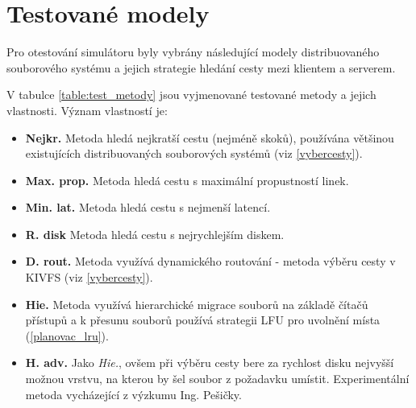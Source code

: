 \documentclass[czech,DP]{thesiskiv}
\begin{document}
\section{Testované modely}

Pro otestování simulátoru byly vybrány následující modely distribuovaného souborového systému a jejich strategie hledání cesty mezi klientem a serverem. 

V tabulce \ref{table:test_metody} jsou vyjmenované testované metody a jejich vlastnosti. Význam vlastností je:

\begin{itemize}
\item \textbf{Nejkr.} Metoda hledá nejkratší cestu (nejméně skoků), používána většinou existujících distribuovaných souborových systémů (viz \ref{vybercesty}).
\item \textbf{Max. prop.} Metoda hledá cestu s maximální propustností linek.
\item \textbf{Min. lat.} Metoda hledá cestu s nejmenší latencí.
\item \textbf{R. disk} Metoda hledá cestu s nejrychlejším diskem.
\item \textbf{D. rout.} Metoda využívá dynamického routování - metoda výběru cesty v KIVFS (viz \ref{vybercesty}).
\item \textbf{Hie.} Metoda využívá hierarchické migrace souborů na základě čítačů přístupů a k přesunu souborů používá strategii LFU pro uvolnění místa (\ref{planovac_lru}).
\item \textbf{H. adv.} Jako \textit{Hie.}, ovšem při výběru cesty bere za rychlost disku nejvyšší možnou vrstvu, na kterou by šel soubor z požadavku umístit. Experimentální metoda vycházející z výzkumu Ing. Pešičky.
\end{itemize}
\end{document}
